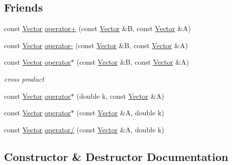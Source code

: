 \subsection*{Friends}
\begin{DoxyCompactItemize}
\item 
const \hyperlink{class_p_c_a_1_1_vector}{Vector} \hyperlink{class_p_c_a_1_1_vector_a28f83573668a6265c637ee1c77618c84}{operator+} (const \hyperlink{class_p_c_a_1_1_vector}{Vector} \&B, const \hyperlink{class_p_c_a_1_1_vector}{Vector} \&A)
\item 
const \hyperlink{class_p_c_a_1_1_vector}{Vector} \hyperlink{class_p_c_a_1_1_vector_a64185acd75c99c1a3a494a41098fd413}{operator-\/} (const \hyperlink{class_p_c_a_1_1_vector}{Vector} \&B, const \hyperlink{class_p_c_a_1_1_vector}{Vector} \&A)
\item 
const \hyperlink{class_p_c_a_1_1_vector}{Vector} \hyperlink{class_p_c_a_1_1_vector_a89de706cc4a715c026fd01dbee37653c}{operator$\ast$} (const \hyperlink{class_p_c_a_1_1_vector}{Vector} \&B, const \hyperlink{class_p_c_a_1_1_vector}{Vector} \&A)
\begin{DoxyCompactList}\small\item\em cross product \end{DoxyCompactList}\item 
const \hyperlink{class_p_c_a_1_1_vector}{Vector} \hyperlink{class_p_c_a_1_1_vector_af3d0ea67d17d9b5c985d776ed9e54bd5}{operator$\ast$} (double k, const \hyperlink{class_p_c_a_1_1_vector}{Vector} \&A)
\item 
const \hyperlink{class_p_c_a_1_1_vector}{Vector} \hyperlink{class_p_c_a_1_1_vector_a31ae6ac45e0b6192e493d884f271a0d6}{operator$\ast$} (const \hyperlink{class_p_c_a_1_1_vector}{Vector} \&A, double k)
\item 
const \hyperlink{class_p_c_a_1_1_vector}{Vector} \hyperlink{class_p_c_a_1_1_vector_a47572e42d2d4fd6fbe0f891d61809e3b}{operator/} (const \hyperlink{class_p_c_a_1_1_vector}{Vector} \&A, double k)
\end{DoxyCompactItemize}


\subsection{Constructor \& Destructor Documentation}
\hypertarget{class_p_c_a_1_1_vector_a978077a8e59322b44add93906e551719}{}\label{class_p_c_a_1_1_vector_a978077a8e59322b44add93906e551719} 
